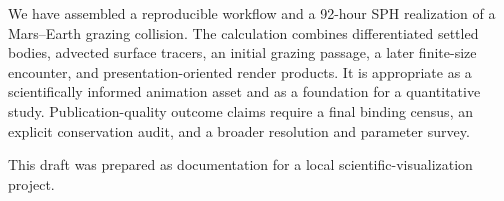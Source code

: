 \documentclass[twocolumn]{aastex631}
\begin{document}
We have assembled a reproducible workflow and a 92-hour SPH realization of a
Mars--Earth grazing collision.  The calculation combines differentiated settled
bodies, advected surface tracers, an initial grazing passage, a later finite-size
encounter, and presentation-oriented render products.  It is appropriate as a
scientifically informed animation asset and as a foundation for a quantitative
study.  Publication-quality outcome claims require a final binding census, an
explicit conservation audit, and a broader resolution and parameter survey.

\acknowledgments
This draft was prepared as documentation for a local scientific-visualization
project.

\end{document}
